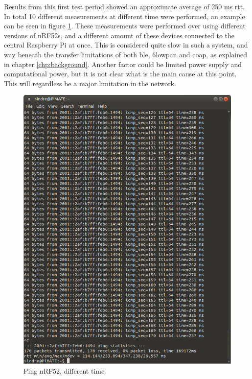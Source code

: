 \noindent Results from this first test period showed an approximate average of 250 ms \gls{rtt}. In total 10 different measurements at different time were performed, an example can be seen in figure \ref{fig:ping2}. These measurements were performed over using different versions of \glspl{nRF52}, and a different amount of these devices connected to the central Raspberry Pi at once. This is considered quite slow in such a system, and way beneath the transfer limitations of both \gls{ble}, \gls{6lowpan} and \gls{coap}, as explained in chapter \ref{chp:background}. Another factor could be limited power supply and computational power, but it is not clear what is the main cause at this point. This will regardless be a major limitation in the network. 


\begin{figure}[ht]
    \centering
    \includegraphics[scale=0.4]{ping3.png}    
    \caption{Ping nRF52, different time}
    \label{fig:ping2}
\end{figure}


